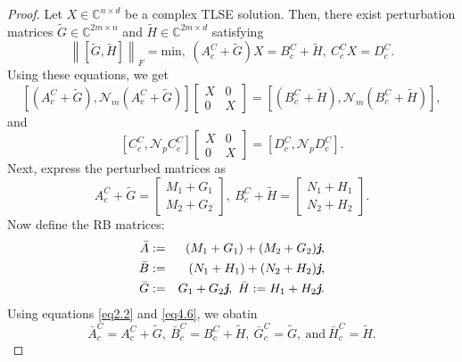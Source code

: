 \documentclass[preprint,11pt,3p]{elsarticle}
\newcommand\norm[1]{\left\lVert#1\right\rVert}
\def \C{{\mathbb C}}
\def \j{\textit{\textbf{j}}}
\begin{document}
\begin{proof}
Let $X \in \C^{n \times d}$ be a complex TLSE solution. Then, there exist perturbation matrices $\widetilde{G} \in \C^{2m \times n}$ and $\widetilde{H} \in \C^{2m \times d}$ satisfying
	\begin{equation*}
		\norm{[\widetilde{G}, \widetilde{H}]}_F= \textrm{min}, ~	(A^C_c+ \widetilde{G})X= B^C_c+ \widetilde{H}, ~ C^C_cX=D^C_c.
	\end{equation*}
Using these equations, we get
	\begin{equation}\label{eq4.5}
		\left[(A^C_c+ \widetilde{G}), \mathcal{N}_m (A^C_c+ \widetilde{G})\right]
		\begin{bmatrix}
			X & 0  \\
			0 & X 
		\end{bmatrix} = \left[(B^C_c+ \widetilde{H}), \mathcal{N}_m (B^C_c+ \widetilde{H})\right],
	\end{equation}
and
	\begin{equation}\label{eq4.51}
		\left[C^C_c, \mathcal{N}_p C^C_c\right]	\begin{bmatrix}
			X & 0  \\
			0 & X 
		\end{bmatrix} = \left[D^C_c, \mathcal{N}_p D^C_c\right].
	\end{equation}
	Next, express the perturbed matrices as
	\begin{equation}\label{eq4.6}
		A^C_c + \widetilde{G}= 
		\begin{bmatrix}
			M_{1}+ G_{1} \\
			M_{2}+ G_{2} 
		\end{bmatrix}, ~ B^C_c+\widetilde{H}= 
		\begin{bmatrix}
			N_1+ H_1  \\
			N_2+ H_2 
		\end{bmatrix}.
	\end{equation}
	Now define the RB matrices:
	\begin{eqnarray*}
		\bar{A}&:=& (M_{1}+G_{1})+ (M_{2}+G_{2})\j, \\
		\bar{B}&:=& (N_1+ H_1)+ (N_2+ H_2)\j, \\
		\bar{G}&:=& G_{1}+ G_{2}\j, ~ \bar{H}:= H_1+ H_2\j.
	\end{eqnarray*}
	Using equations \eqref{eq2.2} and \eqref{eq4.6}, we obatin
	\begin{equation*}
		\bar{A}_c^C= A^C_c+ \widetilde{G}, ~	\bar{B}_c^C= B^C_c+\widetilde{H}, ~ \bar{G}_c^C=  \widetilde{G}, ~ \textrm{and} ~ \bar{H}_c^C= \widetilde{H}. 
	\end{equation*}

\end{proof}
\end{document}
